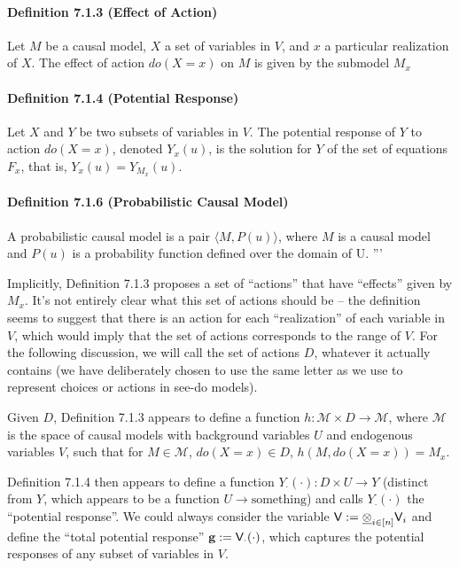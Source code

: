 \paragraph{Definition 7.1.3 (Effect of Action)}
Let $M$ be a causal model, $X$ a set of variables in $V$, and $x$ a particular realization of $X$. The effect of action $do(X=x)$ on $M$ is given by the submodel $M_x$

\paragraph{Definition 7.1.4 (Potential Response)}
Let $X$ and $Y$ be two subsets of variables in $V$. The potential response of $Y$ to action $do(X = x)$, denoted $Y_x(u)$, is the solution for $Y$ of the set of equations $F_x$, that is, $Y_x(u) = Y_{M_x}(u)$.

\paragraph{Definition 7.1.6 (Probabilistic Causal Model)}
A probabilistic causal model is a pair $\langle M, P(u)\rangle$, where $M$ is a causal model and $P(u)$ is a probability function defined over the domain of U.
'''


\vspace{1cm}

Implicitly, Definition 7.1.3 proposes a set of ``actions'' that have ``effects'' given by $M_x$. It's not entirely clear what this set of actions should be -- the definition seems to suggest that there is an action for each ``realization'' of each variable in $V$, which would imply that the set of actions corresponds to the range of $V$. For the following discussion, we will call the set of actions $D$, whatever it actually contains (we have deliberately chosen to use the same letter as we use to represent choices or actions in see-do models).

Given $D$, Definition 7.1.3 appears to define a function $h:\mathscr{M}\times D\to \mathscr{M}$, where $\mathscr{M}$ is the space of causal models with background variables $U$ and endogenous variables $V$, such that for $M\in \mathscr{M}$, $do(X=x)\in D$, $h(M,do(X=x))=M_x$.

Definition 7.1.4 then appears to define a function $Y_\cdot(\cdot):D\times U\to Y$ (distinct from $Y$, which appears to be a function $U\to\text{something}$) and calls $Y_\cdot(\cdot)$ the ``potential response''. We could always consider the variable $\mathsf{V}:=\underline{\otimes}_{i\in [n]} \mathsf{V}_i$ and define the ``total potential response'' $\mathbf{g}:=\mathsf{V}_\cdot(\cdot)$, which captures the potential responses of any subset of variables in $V$.

